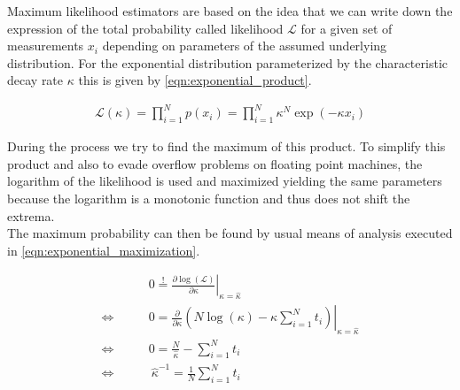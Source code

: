 Maximum likelihood estimators are based on the idea that we can write down the expression of the total probability called likelihood $\mathcal{L}$ for a given set of measurements $x_i$ depending on parameters of the assumed underlying distribution. For the exponential distribution parameterized by the characteristic decay rate $\kappa$ this is given by \autoref{eqn:exponential_product}.

\begin{align}
\label{eqn:exponential_product}
\mathcal{L}(\kappa) = \prod_{i=1}^N p(x_i) = \prod_{i=1}^N \kappa^N \exp\left( - \kappa x_i \right ) 
\end{align}

During the process we try to find the maximum of this product. To simplify this product and also to evade overflow problems on floating point machines, the logarithm of the likelihood is used and maximized yielding the same parameters because the logarithm is a monotonic function and thus does not shift the extrema.\\
The maximum probability can then be found by usual means of analysis executed in \autoref{eqn:exponential_maximization}.

\begin{align}
\label{eqn:exponential_maximization}
& 0 \stackrel{!}{=} \left. \frac{\partial \log (\mathcal{L})}{\partial \kappa} \right|_{\kappa=\hat{\kappa}}\\
\Leftrightarrow \qquad  &0 = \left. \frac{\partial}{\partial \kappa} \left( N \log(\kappa) - \kappa \sum_{i=1}^N t_i \right)  \right|_{\kappa=\hat{\kappa}} \\
\Leftrightarrow \qquad &0 = \frac{N}{\hat{\kappa}} - \sum_{i=1}^N t_i \\
\Leftrightarrow  \qquad & \!\!\!\!\!\!\!\!\: \hat{\kappa}^{-1} = \frac{1}{N} \sum_{i=1}^N t_i  
\end{align}

